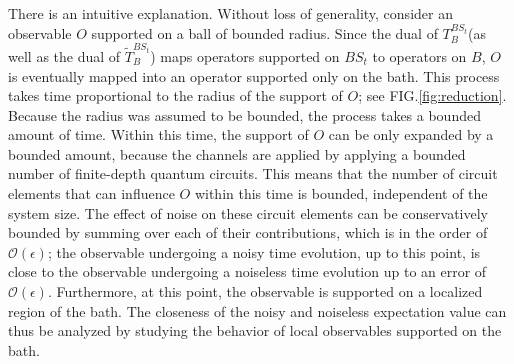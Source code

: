 \documentclass[prx,aps,amsmath,amssymb,floatfix,superscriptaddress,11pt,tightenlines,longbibliography,onecolumn,notitlepage]{revtex4-1}
\begin{document}
There is an intuitive explanation. Without loss of generality, consider an observable $O$ supported on a ball of bounded radius. Since the dual of $T_B^{BS_t}$(as well as the dual of $\tilde{T}_B^{BS_t}$) maps operators supported on $BS_t$ to operators on $B$, $O$ is eventually mapped into an operator supported only on the bath. This process takes time proportional to the radius of the support of $O$; see FIG.\ref{fig:reduction}. Because the radius was assumed to be bounded, the process takes a bounded amount of time. Within this time, the support of $O$ can be only expanded by a bounded amount, because the channels are applied by applying a bounded number of finite-depth quantum circuits. This means that the number of circuit elements that can influence $O$ within this time is bounded, independent of the system size. The effect of noise on these circuit elements can be conservatively bounded by summing over each of their contributions, which is in the order of $\mathcal{O}(\epsilon)$; the observable undergoing a noisy time evolution, up to this point, is close to the observable undergoing a noiseless time evolution up to an error of $\mathcal{O}(\epsilon)$. Furthermore, at this point, the observable is supported on a localized region of the bath. The closeness of the noisy and noiseless expectation value can thus be analyzed by studying the behavior of local observables supported on the bath.
\end{document}
